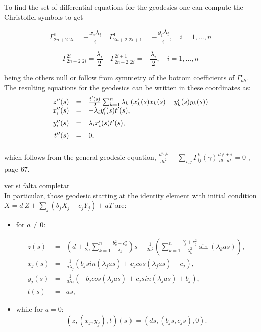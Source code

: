 \documentclass[11pt]{amsart}
\theoremstyle{plain}
\theoremstyle{definition}
\theoremstyle{remark}
\begin{document}
To find the set of differential equations for the geodesics one can compute the Christoffel symbols to get

\[ \Gamma^1_{2n+2 \,\, 2i}=-\frac{x_{i} \lambda_{i}}{4} \quad \Gamma^1_{2n+2 \,\, 2i+1}=-\frac{y_{i} \lambda_{i}}{4}, \quad i=1,..., n \]

\[ \Gamma^{2i}_{2n+2 \,\, 2i}=\frac{\lambda_i}{2} \quad \Gamma^{2i+1}_{2n+2 \,\, 2i}=-\frac{\lambda_i}{2}, \quad i=1,..., n \]

being the others null or follow from symmetry of the bottom coefficients of $\Gamma^c_{a b}$.\\

The resulting equations for the geodesics can be written in these coordinates as:
\begin{equation}\label{geodcomp}
	\begin{array}{rcl}
	z''(s)&= & \frac{ t'(s)}{2}\sum_{k=1}^{n}  \lambda_k \left( x_k'(s) x_k(s)+y_k'(s) y_k(s) \right) \\ \vspace{.2cm}
	x_i''(s)&=&-\lambda_i y_i'(s) t'(s),\\ \vspace{.2cm}
	y_i''(s)&=&\lambda_i x_i'(s) t'(s),\\ \vspace{.2cm}
	t''(s)&=&0,
	\end{array}
\end{equation}

which follows from the general geodesic equation, $\frac{d^2 \gamma^k}{d t^2} + \sum_{i,j} \Gamma^k_{i j}(\gamma) \frac{d \gamma^i}{dt} \frac{d \gamma^j}{dt} = 0$ \cite{ON}, page 67.

ver si falta completar\\

In particular, those geodesic starting at the identity element with initial condition $X =  d \ Z + \sum_j (b_j X_j + c_j Y_j) + a T$ are:

\begin{itemize}
    \item for $a \neq 0$:

\begin{eqnarray} \label{geo_osc_1}
	z(s)&= & \left(d + \frac{1}{2 a} \sum_{k=1}^{n} \frac{ b_{k}^{2}+c_k^{2}}{\lambda_k}\right)s- \frac{1}{2 a^{2}} \left(  \sum_{k=1}^{n} \frac{b_{j}^{2}+c_j^2}{\lambda_k^{2}} \sin(\lambda_k a s) \right),\\
	x_j(s)&=&  \frac{1}{a \lambda_j} \left(   {b_j}sin(\lambda_j a s)+{c_j}cos(\lambda_j a s)-{c_j} \right),\\
	y_j(s)&=&  \frac{1}{a \lambda_j}  \left(    -{b_j}cos(\lambda_j a s)+{c_j} sin(\lambda_j a s)+{b_j} \right),\\ 
	t(s)&=&a s,
\end{eqnarray}
\item while for $a=0$:
\begin{equation}\label{geo2}
(z,(x_j,y_j),t)(s)=(ds,(b_j s,c_j s),0). 
\end{equation}

\end{itemize}
\end{document}
